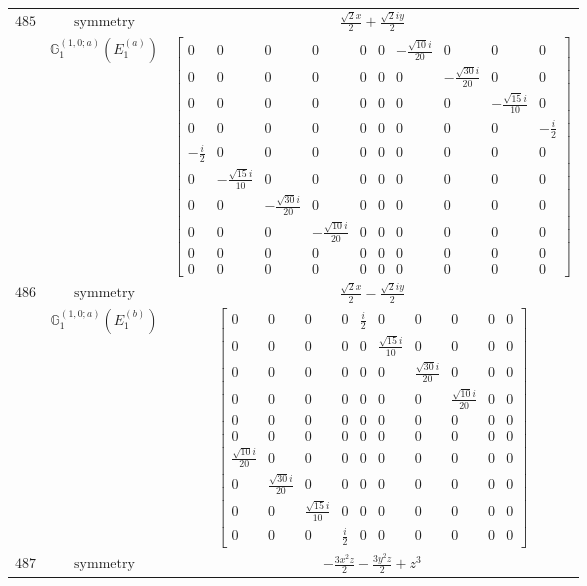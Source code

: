 \documentclass[fleqn,8pt,landscape]{jsarticle}
\begin{document}
\begin{longtable}{ccc}
$ 485 $ & $ \text{symmetry} $ & $ \frac{\sqrt{2} x}{2} + \frac{\sqrt{2} i y}{2} $ \\
$  $ & $ \mathbb{G}_{1}^{(1,0;a)}(E_{1}^{(a)}) $ & $ \begin{bmatrix} 0 & 0 & 0 & 0 & 0 & 0 & - \frac{\sqrt{10} i}{20} & 0 & 0 & 0 \\ 0 & 0 & 0 & 0 & 0 & 0 & 0 & - \frac{\sqrt{30} i}{20} & 0 & 0 \\ 0 & 0 & 0 & 0 & 0 & 0 & 0 & 0 & - \frac{\sqrt{15} i}{10} & 0 \\ 0 & 0 & 0 & 0 & 0 & 0 & 0 & 0 & 0 & - \frac{i}{2} \\ - \frac{i}{2} & 0 & 0 & 0 & 0 & 0 & 0 & 0 & 0 & 0 \\ 0 & - \frac{\sqrt{15} i}{10} & 0 & 0 & 0 & 0 & 0 & 0 & 0 & 0 \\ 0 & 0 & - \frac{\sqrt{30} i}{20} & 0 & 0 & 0 & 0 & 0 & 0 & 0 \\ 0 & 0 & 0 & - \frac{\sqrt{10} i}{20} & 0 & 0 & 0 & 0 & 0 & 0 \\ 0 & 0 & 0 & 0 & 0 & 0 & 0 & 0 & 0 & 0 \\ 0 & 0 & 0 & 0 & 0 & 0 & 0 & 0 & 0 & 0 \end{bmatrix} $ \\ \hline
$ 486 $ & $ \text{symmetry} $ & $ \frac{\sqrt{2} x}{2} - \frac{\sqrt{2} i y}{2} $ \\
$  $ & $ \mathbb{G}_{1}^{(1,0;a)}(E_{1}^{(b)}) $ & $ \begin{bmatrix} 0 & 0 & 0 & 0 & \frac{i}{2} & 0 & 0 & 0 & 0 & 0 \\ 0 & 0 & 0 & 0 & 0 & \frac{\sqrt{15} i}{10} & 0 & 0 & 0 & 0 \\ 0 & 0 & 0 & 0 & 0 & 0 & \frac{\sqrt{30} i}{20} & 0 & 0 & 0 \\ 0 & 0 & 0 & 0 & 0 & 0 & 0 & \frac{\sqrt{10} i}{20} & 0 & 0 \\ 0 & 0 & 0 & 0 & 0 & 0 & 0 & 0 & 0 & 0 \\ 0 & 0 & 0 & 0 & 0 & 0 & 0 & 0 & 0 & 0 \\ \frac{\sqrt{10} i}{20} & 0 & 0 & 0 & 0 & 0 & 0 & 0 & 0 & 0 \\ 0 & \frac{\sqrt{30} i}{20} & 0 & 0 & 0 & 0 & 0 & 0 & 0 & 0 \\ 0 & 0 & \frac{\sqrt{15} i}{10} & 0 & 0 & 0 & 0 & 0 & 0 & 0 \\ 0 & 0 & 0 & \frac{i}{2} & 0 & 0 & 0 & 0 & 0 & 0 \end{bmatrix} $ \\ \hline
$ 487 $ & $ \text{symmetry} $ & $ - \frac{3 x^{2} z}{2} - \frac{3 y^{2} z}{2} + z^{3} $ \\

\end{longtable}
\end{document}
